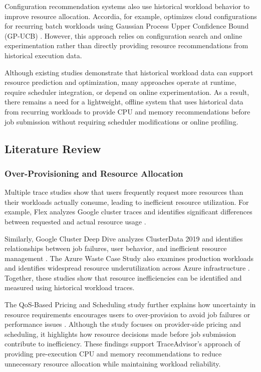 Configuration recommendation systems also use historical workload behavior to improve resource allocation. Accordia, for example, optimizes cloud configurations for recurring batch workloads using Gaussian Process Upper Confidence Bound (GP-UCB) \cite{ref3}. However, this approach relies on configuration search and online experimentation rather than directly providing resource recommendations from historical execution data.

Although existing studies demonstrate that historical workload data can support resource prediction and optimization, many approaches operate at runtime, require scheduler integration, or depend on online experimentation. As a result, there remains a need for a lightweight, offline system that uses historical data from recurring workloads to provide CPU and memory recommendations before job submission without requiring scheduler modifications or online profiling.

\subsection{Literature Review}\label{sec:1.3}

\subsubsection{Over-Provisioning and Resource Allocation}\label{sec:1.3.1}

Multiple trace studies show that users frequently request more resources than their workloads actually consume, leading to inefficient resource utilization. For example, Flex analyzes Google cluster traces and identifies significant differences between requested and actual resource usage \cite{ref1}.

Similarly, Google Cluster Deep Dive analyzes ClusterData 2019 and identifies relationships between job failures, user behavior, and inefficient resource management \cite{ref5}. The Azure Waste Case Study also examines production workloads and identifies widespread resource underutilization across Azure infrastructure \cite{ref6}. Together, these studies show that resource inefficiencies can be identified and measured using historical workload traces.

The QoS-Based Pricing and Scheduling study further explains how uncertainty in resource requirements encourages users to over-provision to avoid job failures or performance issues \cite{ref4}. Although the study focuses on provider-side pricing and scheduling, it highlights how resource decisions made before job submission contribute to inefficiency. These findings support TraceAdvisor's approach of providing pre-execution CPU and memory recommendations to reduce unnecessary resource allocation while maintaining workload reliability.

